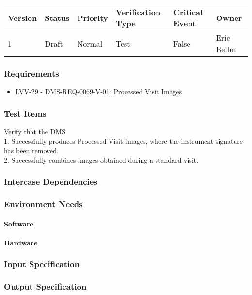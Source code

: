\begin{longtable}[]{llllll}
\toprule
Version & Status & Priority & Verification Type & Critical Event & Owner
\\\midrule
1 & Draft & Normal &
Test & False & Eric Bellm
\\\bottomrule
\end{longtable}

\subsubsection{Requirements}
\begin{itemize}
\item \href{https://jira.lsstcorp.org/browse/LVV-29}{LVV-29} - DMS-REQ-0069-V-01: Processed Visit Images
\end{itemize}

\subsubsection{Test Items}
Verify that the DMS\\
1. Successfully produces Processed Visit Images, where the instrument
signature has been removed.\\
2. Successfully combines images obtained during a standard visit.



\subsubsection{Intercase Dependencies}

\subsubsection{Environment Needs}

\paragraph{Software}

\paragraph{Hardware}

\subsubsection{Input Specification}

\subsubsection{Output Specification}

